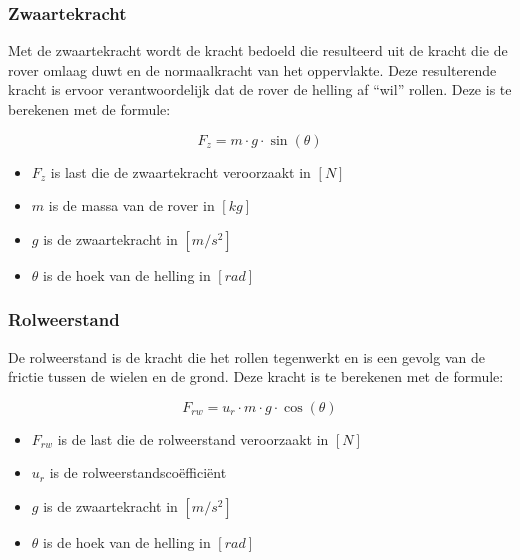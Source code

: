 \documentclass{article}
\begin{document}
        \subsubsection*{Zwaartekracht}
            Met de zwaartekracht wordt de kracht bedoeld die resulteerd uit de kracht die de rover omlaag duwt 
            en de normaalkracht van het oppervlakte. 
            Deze resulterende kracht is ervoor verantwoordelijk dat de rover de helling af ``wil'' rollen.
            Deze is te berekenen met de formule:
            
            \begin{equation}
                F_{z} = m \cdot g \cdot \sin(\theta) 
            \end{equation}

            \begin{itemize}
                \item $F_{z}$ is last die de zwaartekracht veroorzaakt in $[N]$
                \item $m$ is de massa van de rover in $[kg]$
                \item $g$ is de zwaartekracht in $[m/s^2]$
                \item $\theta$ is de hoek van de helling in $[rad]$
            \end{itemize}
        
        \subsubsection*{Rolweerstand}
            De rolweerstand is de kracht die het rollen tegenwerkt en is een gevolg van de frictie tussen de wielen en de grond.
            Deze kracht is te berekenen met de formule:

            \begin{equation}
                F_{rw} =  u_{r} \cdot m \cdot g \cdot \cos(\theta)
            \end{equation}

            \begin{itemize}
                \item $F_{rw}$ is de last die de rolweerstand veroorzaakt in $[N]$
                \item $u_{r}$ is de rolweerstandscoëfficiënt
                \item $g$ is de zwaartekracht in $[m/s^2]$
                \item $\theta$ is de hoek van de helling in $[rad]$
            \end{itemize}
\end{document}
